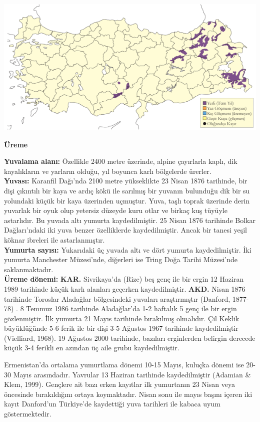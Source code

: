 \documentclass[
  a4paper,
  DIV=11,
  numbers=noendperiod]{scrreprt}
\begin{document}
\includegraphics{images/harita_Page_038.png}

\textbf{Üreme}

\textbf{Yuvalama alanı:} Özellikle 2400 metre üzerinde, alpine
çayırlarla kaplı, dik kayalıkların ve yarların olduğu, yıl boyunca karlı
bölgelerde ürerler.\\
\textbf{Yuvası:} Karanfil Dağı'nda 2100 metre yükseklikte 23 Nisan 1876
tarihinde, bir dişi çıkıntılı bir kaya ve ardıç kökü ile sarılmış bir
yuvanın bulunduğu dik bir su yolundaki küçük bir kaya üzerinden
uçmuştur. Yuva, taşlı toprak üzerinde derin yuvarlak bir oyuk olup
yetersiz düzeyde kuru otlar ve birkaç kuş tüyüyle astarlıdır. Bu yuvada
altı yumurta kaydedilmiştir. 25 Nisan 1876 tarihinde Bolkar
Dağları'ndaki iki yuva benzer özelliklerde kaydedilmiştir. Ancak bir
tanesi yeşil köknar ibreleri ile astarlanmıştır.\\
\textbf{Yumurta sayısı:} Yukarıdaki üç yuvada altı ve dört yumurta
kaydedilmiştir. İki yumurta Manchester Müzesi'nde, diğerleri ise Tring
Doğa Tarihi Müzesi'nde saklanmaktadır.\\
\textbf{Üreme dönemi:} \textbf{KAR.} Sivrikaya'da (Rize) beş genç ile
bir ergin 12 Haziran 1989 tarihinde küçük karlı alanları geçerken
kaydedilmiştir. \textbf{AKD.} Nisan 1876 tarihinde Toroslar Aladağlar
bölgesindeki yuvaları araştırmıştır (Danford, 1877-78) . 8 Temmuz 1986
tarihinde Aladağlar'da 1-2 haftalık 5 genç ile bir ergin gözlenmiştir.
İlk yumurta 21 Mayıs tarihinde bırakılmış olmalıdır. Çil Keklik
büyüklüğünde 5-6 ferik ile bir dişi 3-5 Ağustos 1967 tarihinde
kaydedilmiştir (Vielliard, 1968). 19 Ağustos 2000 tarihinde, bazıları
erginlerden belirgin derecede küçük 3-4 ferikli en azından üç aile grubu
kaydedilmiştir.

Ermenistan'da ortalama yumurtlama dönemi 10-15 Mayıs, kuluçka dönemi ise
20-30 Mayıs arasındadır. Yavrular 13 Haziran tarihinde kaydedilmiştir
(Adamian \& Klem, 1999). Gençlere ait bazı erken kayıtlar ilk yumurtanın
23 Nisan veya öncesinde bırakıldığını ortaya koymaktadır. Nisan sonu ile
mayıs başını içeren iki kayıt Danford'un Türkiye'de kaydettiği yuva
tarihleri ile kabaca uyum göstermektedir.
\end{document}
